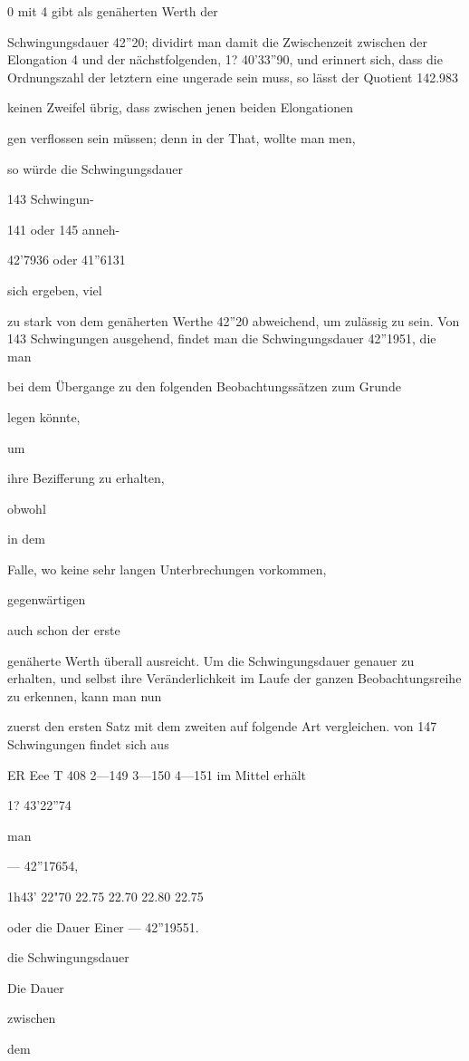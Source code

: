 \documentclass[12pt,a4paper]{article}
\begin{document}
0 mit 4 gibt als genäherten Werth der

Schwingungsdauer 42”20; dividirt man damit die Zwischenzeit zwischen der Elongation 4 und der nächstfolgenden, 1? 40'33”90, und erinnert sich, dass die Ordnungszahl der letztern eine ungerade sein muss, so lässt der Quotient 142.983

keinen Zweifel übrig, dass zwischen jenen beiden Elongationen

gen verflossen sein müssen; denn in der That, wollte man men,

so würde die Schwingungsdauer

143 Schwingun-

141 oder 145 anneh-

42’7936 oder 41”6131

sich ergeben, viel

zu stark von dem genäherten Werthe 42”20 abweichend, um zulässig zu sein. Von 143 Schwingungen ausgehend, findet man die Schwingungsdauer 42”1951, die man

bei dem Übergange zu den folgenden Beobachtungssätzen zum Grunde

legen könnte,

um

ihre Bezifferung zu erhalten,

obwohl

in dem

Falle, wo keine sehr langen Unterbrechungen vorkommen,

gegenwärtigen

auch schon der erste

genäherte Werth überall ausreicht. Um die Schwingungsdauer genauer zu erhalten, und selbst ihre Veränderlichkeit im Laufe der ganzen Beobachtungsreihe zu erkennen, kann man nun

zuerst den ersten Satz mit dem zweiten auf folgende Art vergleichen. von 147 Schwingungen findet sich aus

ER Eee T 408 2—149 3—150 4—151 im Mittel erhält

1? 43’22”74

man

— 42”17654,

1h43’ 22"70 22.75 22.70 22.80 22.75

oder die Dauer Einer — 42”19551.

die Schwingungsdauer

Die Dauer

zwischen

dem
\end{document}
